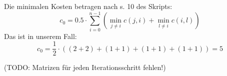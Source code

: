 \documentclass[10pt,a4paper]{article}
\begin{document}
\begin{enumerate}[label={\alph*)}]
\begin{figure}[H]
{                }
            \end{figure}
            Die minimalen Kosten betragen nach s. 10 des Skripts:
            $$
                c_0 = 0.5 \cdot \sum_{i=0}^{n-1} 
                \left( \min\limits_{j \neq i} c(j,i) + 
                \min\limits_{l \neq i} c(i,l) \right)
            $$
            Das ist in unserem Fall:
            $$
                c_0 = \frac{1}{2} \cdot 
                    ((2+2)+(1+1)+(1+1)+(1+1))
                    = 5
            $$
            \begin{figure}[H]
                \centering
                \def\svgwidth{\columnwidth}
            \end{figure}
            (TODO: Matrizen f\"ur jeden Iterationsschritt fehlen!)
            
    \end{enumerate}
\end{document}

